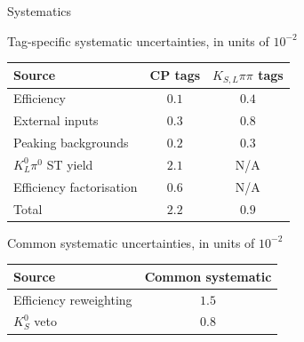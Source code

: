 \documentclass{beamer}
\begin{document}
\begin{frame}{Systematics}
  \begin{center}
    \def\arraystretch{1.2}%
    Tag-specific systematic uncertainties, in units of $10^{-2}$ \\
    \begin{tabular}{lcc}
      \hline
      Source                   & CP tags & $K_{S, L}\pi\pi$ tags \\
      \hline
      Efficiency               & $0.1$   & $0.4$ \\
      External inputs          & $0.3$   & $0.8$ \\
      Peaking backgrounds      & $0.2$   & $0.3$ \\
      $K^0_L\pi^0$ ST yield    & $2.1$   & N/A \\
      Efficiency factorisation & $0.6$   & N/A \\
      \hline
      Total                    & $2.2$   & $0.9$ \\
      \hline
    \end{tabular}
  \end{center}
  \begin{center}
    \def\arraystretch{1.2}%
    Common systematic uncertainties, in units of $10^{-2}$ \\
    \begin{tabular}{lc}
      \hline
      Source                 & Common systematic \\
      \hline
      Efficiency reweighting & $1.5$ \\
      $K^0_S$ veto           & $0.8$ \\
      \hline
    \end{tabular}
  \end{center}
\end{frame}
\end{document}
